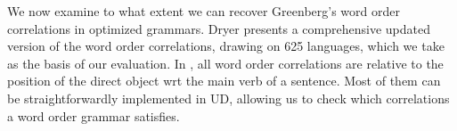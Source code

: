 \documentclass[9pt,twocolumn,twoside,lineno]{pnas-new}
\newcommand{\cmark}{\ding{51}}%
\newcommand{\xmark}{\ding{55}}%
\begin{document}



We now examine to what extent we can recover Greenberg's word order correlations in optimized grammars. 
Dryer \cite{dryer1992greenbergian} presents a comprehensive updated version of the word order correlations, drawing on 625 languages, which we take as the basis of our evaluation.
In \cite{dryer1992greenbergian}, all word order correlations are relative to the position of the direct object wrt the main verb of a sentence.
Most of them can be straightforwardly implemented in UD, allowing us to check which correlations a word order grammar satisfies.
\end{document}
